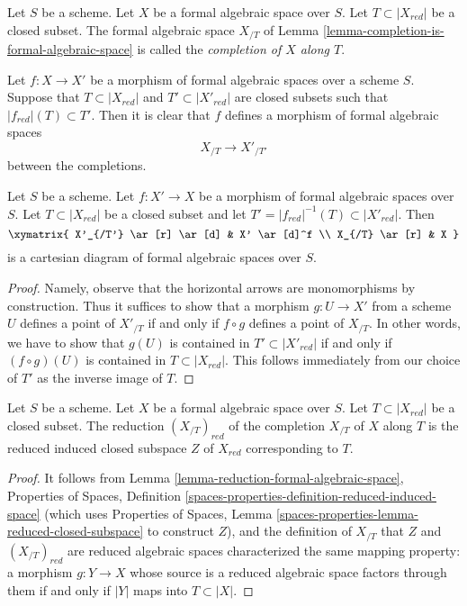 \begin{definition}
\label{definition-completion-formal-algebraic-space}
Let $S$ be a scheme. Let $X$ be a formal algebraic space over $S$.
Let $T \subset |X_{red}|$ be a closed subset. The formal algebraic space
$X_{/T}$ of Lemma \ref{lemma-completion-is-formal-algebraic-space}
is called the {\it completion of $X$ along $T$}.
\end{definition}

\noindent
Let $f : X \to X'$ be a morphism of formal algebraic spaces over a scheme $S$.
Suppose that $T \subset |X_{red}|$ and $T' \subset |X'_{red}|$
are closed subsets such that $|f_{red}|(T) \subset T'$. Then it is clear that
$f$ defines a morphism of formal algebraic spaces
$$
X_{/T} \longrightarrow X'_{/T'}
$$
between the completions.

\begin{lemma}
\label{lemma-map-recompletions}
Let $S$ be a scheme. Let $f : X' \to X$ be a morphism
of formal algebraic spaces over $S$. Let $T \subset |X_{red}|$
be a closed subset and let $T' = |f_{red}|^{-1}(T) \subset |X'_{red}|$.
Then
$$
\xymatrix{
X'_{/T'} \ar[r] \ar[d] & X' \ar[d]^f \\
X_{/T} \ar[r] & X
}
$$
is a cartesian diagram of formal algebraic spaces over $S$.
\end{lemma}

\begin{proof}
Namely, observe that the horizontal arrows are monomorphisms
by construction. Thus it suffices to show that a morphism
$g : U \to X'$ from a scheme $U$ defines a point of $X'_{/T}$
if and only if $f \circ g$ defines a point of $X_{/T}$.
In other words, we have to show that
$g(U)$ is contained in $T' \subset |X'_{red}|$
if and only if $(f \circ g)(U)$ is contained in $T \subset |X_{red}|$.
This follows immediately from our choice of $T'$ as the
inverse image of $T$.
\end{proof}

\begin{lemma}
\label{lemma-reduction-recompletion}
Let $S$ be a scheme. Let $X$ be a formal algebraic space over $S$.
Let $T \subset |X_{red}|$ be a closed subset. The reduction
$(X_{/T})_{red}$ of the completion $X_{/T}$ of $X$ along $T$ is
the reduced induced closed subspace $Z$ of $X_{red}$ corresponding to $T$.
\end{lemma}

\begin{proof}
It follows from Lemma \ref{lemma-reduction-formal-algebraic-space},
Properties of Spaces, Definition
\ref{spaces-properties-definition-reduced-induced-space}
(which uses Properties of Spaces, Lemma
\ref{spaces-properties-lemma-reduced-closed-subspace} to construct $Z$),
and the definition of $X_{/T}$ that
$Z$ and $(X_{/T})_{red}$ are reduced algebraic spaces
characterized the same mapping property:
a morphism $g : Y \to X$ whose source is a reduced algebraic space
factors through them if and only if $|Y|$ maps into $T \subset |X|$.
\end{proof}

